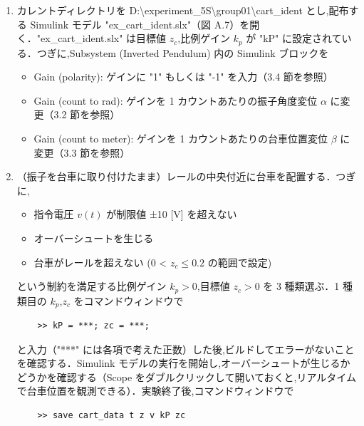\begin{enumerate}
  \item カレントディレクトリを D:\textbackslash experiment\_5S\textbackslash group01\textbackslash cart\_ident とし,配布する Simulink モデル "ex\_cart\_ident.slx"（図 A.7）を開く．"ex\_cart\_ident.slx" は目標値 \( z_c \),比例ゲイン \( k_p \) が "kP" に設定されている．つぎに,Subsystem (Inverted Pendulum) 内の Simulink ブロックを
        \begin{itemize}
          \item Gain (polarity): ゲインに "1" もしくは "-1" を入力（3.4 節を参照）
          \item Gain (count to rad): ゲインを 1 カウントあたりの振子角度変位 \( \alpha \) に変更（3.2 節を参照）
          \item Gain (count to meter): ゲインを 1 カウントあたりの台車位置変位 \( \beta \) に変更（3.3 節を参照）
        \end{itemize}
  \item （振子を台車に取り付けたまま）レールの中央付近に台車を配置する．つぎに,
        \begin{itemize}
          \item 指令電圧 \( v(t) \) が制限値 ±10 [V] を超えない
          \item オーバーシュートを生じる
          \item 台車がレールを超えない (0 < \( z_c \leq 0.2 \) の範囲で設定)
        \end{itemize}
        という制約を満足する比例ゲイン \( k_p > 0 \),目標値 \( z_c > 0 \) を 3 種類選ぶ．1 種類目の \( k_p \),\( z_c \) をコマンドウィンドウで
        \begin{tcolorbox}[colback=gray!5!white,colframe=gray!75!black]
          \begin{lstlisting}
    >> kP = ***; zc = ***;
    \end{lstlisting}
        \end{tcolorbox}
        と入力（"***" には各項で考えた正数）した後,ビルドしてエラーがないことを確認する．Simulink モデルの実行を開始し,オーバーシュートが生じるかどうかを確認する（Scope をダブルクリックして開いておくと,リアルタイムで台車位置を観測できる）．実験終了後,コマンドウィンドウで
        \begin{tcolorbox}[colback=gray!5!white,colframe=gray!75!black]
          \begin{lstlisting}
    >> save cart_data t z v kP zc
    \end{lstlisting}
        \end{tcolorbox}

\end{enumerate}
